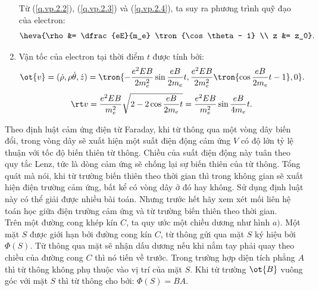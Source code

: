\begin{loigiai}
\begin{enumerate}[1)]
Từ (\ref{q.vp.2.2}), (\ref{q.vp.2.3}) và (\ref{q.vp.2.4}), ta suy ra phương trình quỹ đạo của electron:
\[\heva{\rho &= \dfrac{eE}{m_e} \tron{\cos \theta - 1} \\ z &= z_0}.\]
\item Vận tốc của electron tại thời điểm $t$ được tính bởi:
\[\ot{v}=(\dot{\rho}, \rho \dot{\theta}, \dot{z}) = \tron{-\dfrac{e^2EB}{2m_e^2}\sin \dfrac{eB}{2m_e}t, \dfrac{e^2EB}{2m_e^2} \tron{\cos \dfrac{eB}{2m_e} t - 1}, 0}.\]
\[\rt v = \dfrac{e^2EB}{m_e^2} \sqrt{2 - 2\cos \dfrac{eB}{2m_e} t} = \dfrac{e^2EB}{m_e^2} \sin \dfrac{eB}{4m_e} t.\]
\end{enumerate}
\end{loigiai}



\begin{vd}
Theo định luật cảm ứng điện từ Faraday, khi từ thông qua một vòng dây biến đổi, trong vòng dây sẽ xuất hiện một suất điện động cảm ứng ${V}$ có độ lớn tỷ lệ thuận với tốc độ biến thiên từ thông. Chiều của suất điện động này tuân theo quy tắc Lenz, tức là dòng cảm ứng sẽ chống lại sự biến thiên của từ thông. Tổng quát mà nói, khi từ trường biến thiên theo thời gian thì trong không gian sẽ xuất hiện điện trường cảm ứng, bất kể có vòng dây ở đó hay không. Sử dụng định luật này có thể giải được nhiều bài toán. Nhưng trước hết hãy xem xét mối liên hệ toán học giữa điện trường cảm ứng và từ trường biến thiên theo thời gian.\\
Trên một đường cong khép kín ${C}$, ta quy ước một chiều dương như hình ${a})$. Một mặt ${S}$ được giới hạn bởi đường cong kín ${C}$, từ thông gửi qua mặt ${S}$ ký hiệu bởi $\Phi({S})$. Từ thông qua mặt sẽ nhận dấu dương nếu khi nắm tay phải quay theo chiều của đường cong ${C}$ thì nó tiến về trước. Trong trường hợp diện tích phẳng $A$ thì từ thông không phụ thuộc vào vị trí của mặt $S$. Khi từ trường $\ot{B}$ vuông góc với mặt ${S}$ thì từ thông cho bởi: $\Phi({S}) = {BA}$.
\begin{center}



\begin{tikzpicture}[x=0.75pt,y=0.75pt,yscale=-1,xscale=1]


\end{tikzpicture}
\end{center}
\end{vd}
